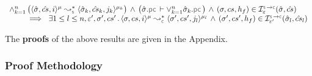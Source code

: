 \begin{corollary}[Verification]\label{corollary:verification}
$$
\begin{array}{l}
\wedge_{k=1}^n \, \big( \transabssemrule{\sstate, \scs, i}{\sstate_k, \scs_k, j_k}{\mode}{\mode_k}{\symbolic}  \big)
    \, \wedge \, \big( \sstate.\pcsel \vdash \vee_{k=1}^n \sstate_k.\pcsel \big) 
    \, \wedge \, (\jstate, \cs, \heap_f) \in \interpret{\symbconc}{\senv}(\sstate, \scs)
    \\ \quad \quad
%
      \ \implies \ \exists 1 \leq l \leq n, \senv', \jstate', \cs' \, . \, 
           \transabssemrule{\jstate, \cs, i}{\jstate', \cs', j_l}{\mode}{\mode_l}{\concrete}
           \, \wedge \, 
           (\jstate', \cs', \heap_f) \in \interpret{\symbconc}{\senv'}(\sstate_l, \scs_l)
\end{array}
$$
\end{corollary}

%
The {\bf proofs} of the above results are given in the Appendix.  

\subsubsection{Proof Methodology}

